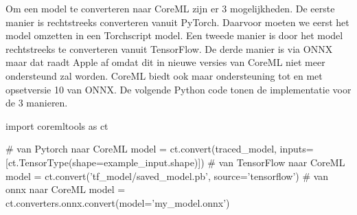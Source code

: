 Om een model te converteren naar CoreML zijn er 3 mogelijkheden.
De eerste manier is rechtstreeks converteren vanuit PyTorch.
Daarvoor moeten we eerst het model omzetten in een Torchscript model.
Een tweede manier is door het model rechtstreeks te converteren vanuit TensorFlow.
De derde manier is via ONNX maar dat raadt Apple af omdat dit in nieuwe versies van CoreML niet meer ondersteund zal worden.
CoreML biedt ook maar ondersteuning tot en met opsetversie 10 van ONNX.
De volgende Python code tonen de implementatie voor de 3 manieren.

\begin{python}
import coremltools as ct

# van Pytorch naar CoreML
model = ct.convert(traced_model, inputs=[ct.TensorType(shape=example_input.shape)])
# van TensorFlow naar CoreML
model = ct.convert('tf_model/saved_model.pb', source='tensorflow')
# van onnx naar CoreML
model  = ct.converters.onnx.convert(model='my_model.onnx')
\end{python}



